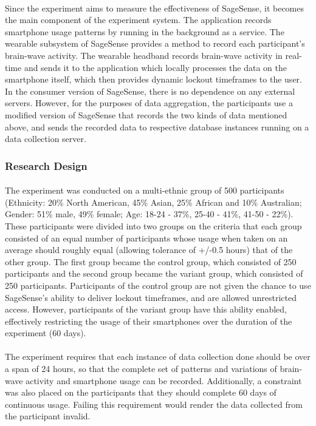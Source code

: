 \documentclass{article}
\begin{document}
\paragraph{} Since the experiment aims to measure the effectiveness of SageSense, it becomes the main component of the experiment system. The application records smartphone usage patterns by running in the background as a service. The wearable subsystem of SageSense provides a method to record each participant's brain-wave activity. The wearable headband records brain-wave activity in real-time and sends it to the application which locally processes the data on the smartphone itself, which then provides dynamic lockout timeframes to the user. In the consumer version of SageSense, there is no dependence on any external servers. However, for the purposes of data aggregation, the participants use a modified version of SageSense that records the two kinds of data mentioned above, and sends the recorded data to respective database instances running on a data collection server.

\subsubsection{Research Design}

\paragraph{} The experiment was conducted on a multi-ethnic group of 500 participants (Ethnicity: 20\% North American, 45\% Asian, 25\% African and 10\% Australian; Gender: 51\% male, 49\% female; Age: 18-24 - 37\%, 25-40 - 41\%, 41-50 - 22\%). These participants were divided into two groups on the criteria that each group consisted of an equal number of participants whose usage when taken on an average should roughly equal (allowing tolerance of +/-0.5 hours) that of the other group. The first group became the control group, which consisted of 250 participants and the second group became the variant group, which consisted of 250 participants. Participants of the control group are not given the chance to use SageSense's ability to deliver lockout timeframes, and are allowed unrestricted access. However, participants of the variant group have this ability enabled, effectively restricting the usage of their smartphones over the duration of the experiment (60 days).

\paragraph{} The experiment requires that each instance of data collection done should be over a span of 24 hours, so that the complete set of patterns and variations of brain-wave activity and smartphone usage can be recorded. Additionally, a constraint was also placed on the participants that they should complete 60 days of continuous usage. Failing this requirement would render the data collected from the participant invalid.
\end{document}
